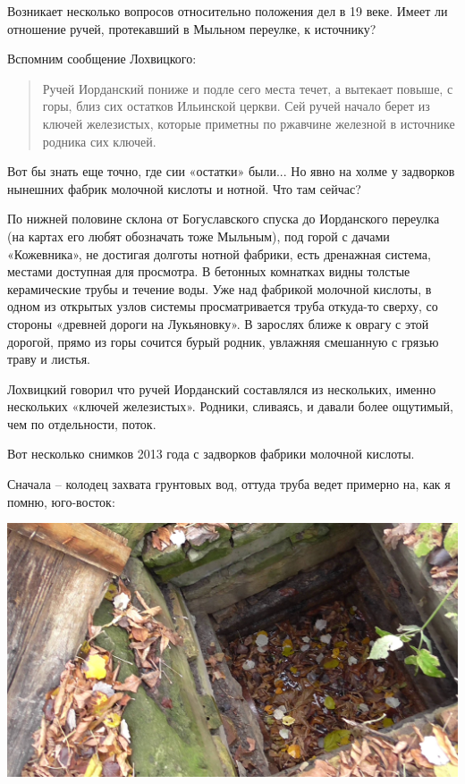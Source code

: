 Возникает несколько вопросов относительно положения дел в 19 веке. Имеет ли отношение ручей, протекавший в Мыльном переулке, к источнику?

Вспомним сообщение Лохвицкого: 

\begin{quotation}
Ручей Иорданский пониже и подле сего места течет, а вытекает повыше, с горы, близ сих остатков Ильинской церкви. Сей ручей начало берет из ключей железистых, которые приметны по ржавчине железной в источнике родника сих ключей.
\end{quotation}

Вот бы знать еще точно, где сии «остатки» были... Но явно на холме у задворков нынешних фабрик молочной кислоты и нотной. Что там сейчас?

По нижней половине склона от Богуславского спуска до Иорданского переулка (на картах его любят обозначать тоже Мыльным), под горой с дачами «Кожевника», не достигая долготы нотной фабрики, есть дренажная система, местами доступная для просмотра. В бетонных комнатках видны толстые керамические трубы и течение воды. Уже над фабрикой молочной кислоты, в одном из открытых узлов системы просматривается труба откуда-то сверху, со стороны «древней дороги на Лукьяновку». В зарослях ближе к оврагу с этой дорогой, прямо из горы сочится бурый родник, увлажняя смешанную с грязью траву и листья.

Лохвицкий говорил что ручей Иорданский составлялся из нескольких, именно нескольких «ключей железистых». Родники, сливаясь, и давали более ощутимый, чем по отдельности, поток.

Вот несколько снимков 2013 года с задворков фабрики молочной кислоты.

Сначала – колодец захвата грунтовых вод, оттуда труба ведет примерно на, как я помню, юго-восток:

\begin{center}
\includegraphics[width=\linewidth]{chast-kirvys/iordanruch/s_vlcsnap-2014-05-16-20h08m14s138.jpg}
\end{center}

